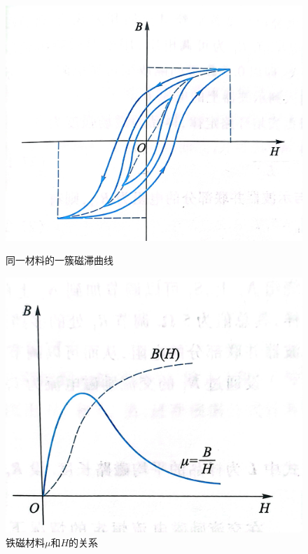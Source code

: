 \documentclass{ctexart}
\begin{document}
  \begin{figure}[H]
    \begin{minipage}[t]{0.45\textwidth}
      \centering
      \includegraphics[width=\textwidth,height=0.3\textheight]{tongyicailiaoqvxian.jpg}
      \caption{同一材料的一簇磁滞曲线}
      \label{tongyicailiaoqvxian}
    \end{minipage}
    \begin{minipage}[t]{0.45\textwidth}
      \centering
      \includegraphics[width=\textwidth,height=0.3\textheight]{muH.jpg}
      \caption{铁磁材料$\mu$和$H$的关系}
      \label{muH}
    \end{minipage}
  \end{figure}
\end{document}
